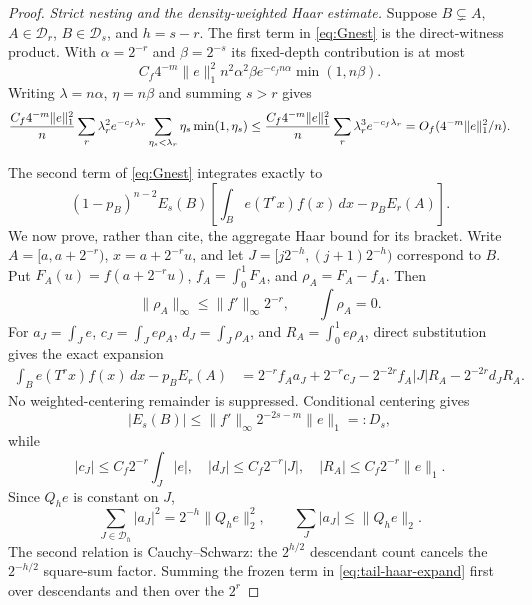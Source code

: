 \documentclass[11pt]{article}
\numberwithin{equation}{section}
\newcommand{\1}{\mathbf 1}\newcommand{\F}{\mathcal F}\newcommand{\D}{\mathcal D}
\newcommand{\norm}[1]{\lVert#1\rVert}
\begin{document}
\begin{proof}
\emph{Strict nesting and the density-weighted Haar estimate.}
Suppose $B\subsetneq A$, $A\in\D_r$, $B\in\D_s$, and $h=s-r$.
The first term in \eqref{eq:Gnest} is the direct-witness product.  With
$\alpha=2^{-r}$ and $\beta=2^{-s}$ its fixed-depth contribution is at most
\[
 C_f4^{-m}\norm e_1^2n^2\alpha^2\beta
 e^{-c_fn\alpha}\min(1,n\beta).
\]
Writing $\lambda=n\alpha$, $\eta=n\beta$ and summing $s>r$ gives
\begin{equation}\label{eq:tail-nest-direct}
 {C_f4^{-m}\norm e_1^2\over n}
 \sum_r\lambda_r^2e^{-c_f\lambda_r}
 \sum_{\eta_s<\lambda_r}\eta_s\min(1,\eta_s)
 \le {C_f4^{-m}\norm e_1^2\over n}
 \sum_r\lambda_r^3e^{-c_f\lambda_r}=O_f(4^{-m}\norm e_1^2/n).
\end{equation}

The second term of \eqref{eq:Gnest} integrates exactly to
\begin{equation}\label{eq:tail-nest-centered}
 (1-p_B)^{n-2}E_s(B)
 \left[\int_Be(T^rx)f(x)\,dx-p_BE_r(A)\right].
\end{equation}
We now prove, rather than cite, the aggregate Haar bound for its bracket.
Write $A=[a,a+2^{-r})$, $x=a+2^{-r}u$, and let
$J=[j2^{-h},(j+1)2^{-h})$ correspond to $B$.  Put
$F_A(u)=f(a+2^{-r}u)$, $f_A=\int_0^1F_A$, and
$\rho_A=F_A-f_A$.  Then
\[
 \norm{\rho_A}_\infty\le\norm{f'}_\infty2^{-r},\qquad
 \int\rho_A=0.
\]
For
$a_J=\int_Je$, $c_J=\int_Je\rho_A$, $d_J=\int_J\rho_A$, and
$R_A=\int_0^1e\rho_A$, direct substitution gives the exact expansion
\begin{align}
 \int_Be(T^rx)f(x)\,dx-p_BE_r(A)
 &=2^{-r}f_Aa_J+2^{-r}c_J
   -2^{-2r}f_A|J|R_A-2^{-2r}d_JR_A.             \label{eq:tail-haar-expand}
\end{align}
No weighted-centering remainder is suppressed.  Conditional centering gives
\begin{equation}\label{eq:tail-deepmoment}
 |E_s(B)|\le\norm{f'}_\infty2^{-2s-m}\norm e_1=:D_s,
\end{equation}
while
\[
 |c_J|\le C_f2^{-r}\int_J|e|,\quad |d_J|\le C_f2^{-r}|J|,
 \quad |R_A|\le C_f2^{-r}\norm e_1.
\]
Since $Q_he$ is constant on $J$,
\begin{equation}\label{eq:tail-haar-square}
 \sum_{J\in\D_h}|a_J|^2=2^{-h}\norm{Q_he}_2^2,\qquad
 \sum_J|a_J|\le\norm{Q_he}_2.
\end{equation}
The second relation is Cauchy--Schwarz: the $2^{h/2}$ descendant count
cancels the $2^{-h/2}$ square-sum factor.  Summing the frozen term in
\eqref{eq:tail-haar-expand} first over descendants and then over the $2^r$

\end{proof}
\end{document}
